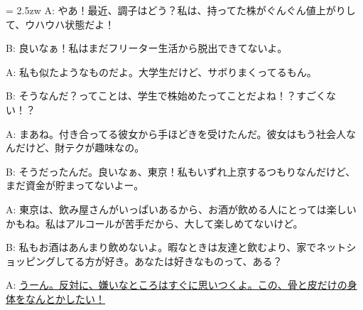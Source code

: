 \documentclass[11pt]{amsart}
\title{}
\author{}
\newenvironment{hangall}[1]{\hangindent = 2.5zw\everypar{\hangindent = 2.5zw}}{}
\begin{document}
\maketitle
\begin{hangall}{}%
A: やあ！最近、調子はどう？私は、持ってた株がぐんぐん値上がりして、ウハウハ状態だよ！

B: 良いなぁ！私はまだフリーター生活から脱出できてないよ。

A: 私も似たようなものだよ。大学生だけど、サボりまくってるもん。

B: そうなんだ？ってことは、学生で株始めたってことだよね！？すごくない！？

A: まあね。付き合ってる彼女から手ほどきを受けたんだ。彼女はもう社会人なんだけど、財テクが趣味なの。

B: そうだったんだ。良いなぁ、東京！私もいずれ上京するつもりなんだけど、まだ資金が貯まってないよー。

A: 東京は、飲み屋さんがいっぱいあるから、お酒が飲める人にとっては楽しいかもね。私はアルコールが苦手だから、大して楽しめてないけど。

B: 私もお酒はあんまり飲めないよ。暇なときは友達と飲むより、家でネットショッピングしてる方が好き。あなたは好きなものって、ある？

A: \ul{うーん。反対に、嫌いなところはすぐに思いつくよ。この、骨と皮だけの身体をなんとかしたい！}\end{hangall}
\end{document}
